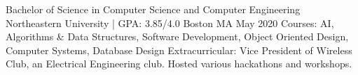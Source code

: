 

\begin{cventries}

  \cventry
    {Bachelor of Science in Computer Science and Computer Engineering} %
    {Northeastern University | GPA: 3.85/4.0} %
    {Boston MA} %
    {May 2020} %
    {
      Courses: AI, Algorithms \& Data Structures, Software Development, Object Oriented Design, Computer Systems, Database Design
      Extracurricular: Vice President of Wireless Club, an Electrical Engineering club. Hosted various hackathons and workshops.
    }

\end{cventries}
